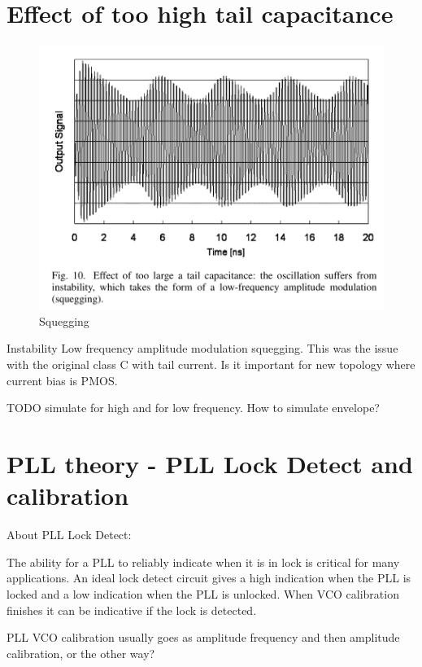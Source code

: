 \documentclass{article}
\begin{document}
\section{Effect of too high tail capacitance}

\begin{figure}[!ht]
	\includegraphics[width=\linewidth]{Figures/squegging.png}
	\caption{Squegging}
	\label{fig:squegging}
\end{figure}

Instability Low frequency amplitude modulation squegging. This was the issue with the original class C with tail current. Is it important for new topology where current bias is PMOS.

TODO simulate for high and for low frequency. How to simulate envelope? 

\section{PLL theory - PLL Lock Detect and calibration}

About PLL Lock Detect:

\begin{info} %
	The ability for a PLL to reliably indicate when it is in lock is critical for many applications. An ideal lock detect circuit gives a high indication when the PLL is locked and a low indication when the PLL is unlocked. When VCO calibration finishes it can be indicative if the lock is detected. 
\end{info}

PLL VCO calibration usually goes as amplitude frequency and then amplitude calibration, or the other way?
\end{document}
